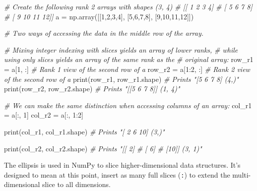 \documentclass[
]{article}
\newenvironment{Shaded}{}{}
\newcommand{\BuiltInTok}[1]{#1}
\newcommand{\CommentTok}[1]{\textcolor[rgb]{0.38,0.63,0.69}{\textit{#1}}}
\newcommand{\DecValTok}[1]{\textcolor[rgb]{0.25,0.63,0.44}{#1}}
\newcommand{\NormalTok}[1]{#1}
\newcommand{\OperatorTok}[1]{\textcolor[rgb]{0.40,0.40,0.40}{#1}}
\begin{document}
\begin{Shaded}
\begin{Highlighting}[]
\CommentTok{\# Create the following rank 2 arrays with shapes (3, 4)}
\CommentTok{\# [[ 1  2  3  4]}
\CommentTok{\#  [ 5  6  7  8]}
\CommentTok{\#  [ 9 10 11 12]]}
\NormalTok{a }\OperatorTok{=}\NormalTok{ np.array([[}\DecValTok{1}\NormalTok{,}\DecValTok{2}\NormalTok{,}\DecValTok{3}\NormalTok{,}\DecValTok{4}\NormalTok{], }
\NormalTok{              [}\DecValTok{5}\NormalTok{,}\DecValTok{6}\NormalTok{,}\DecValTok{7}\NormalTok{,}\DecValTok{8}\NormalTok{], }
\NormalTok{              [}\DecValTok{9}\NormalTok{,}\DecValTok{10}\NormalTok{,}\DecValTok{11}\NormalTok{,}\DecValTok{12}\NormalTok{]])}

\CommentTok{\# Two ways of accessing the data in the middle row of the array.}

\CommentTok{\# Mixing integer indexing with slices yields an array of lower ranks,}
\CommentTok{\# while using only slices yields an array of the same rank as the}
\CommentTok{\# original array:}
\NormalTok{row\_r1 }\OperatorTok{=}\NormalTok{ a[}\DecValTok{1}\NormalTok{, :]    }\CommentTok{\# Rank 1 view of the second row of a}
\NormalTok{row\_r2 }\OperatorTok{=}\NormalTok{ a[}\DecValTok{1}\NormalTok{:}\DecValTok{2}\NormalTok{, :]  }\CommentTok{\# Rank 2 view of the second row of a}
\BuiltInTok{print}\NormalTok{(row\_r1, row\_r1.shape)  }\CommentTok{\# Prints "[5 6 7 8] (4,)"}
\BuiltInTok{print}\NormalTok{(row\_r2, row\_r2.shape)  }\CommentTok{\# Prints "[[5 6 7 8]] (1, 4)"}

\CommentTok{\# We can make the same distinction when accessing columns of an array:}
\NormalTok{col\_r1 }\OperatorTok{=}\NormalTok{ a[:, }\DecValTok{1}\NormalTok{]}
\NormalTok{col\_r2 }\OperatorTok{=}\NormalTok{ a[:, }\DecValTok{1}\NormalTok{:}\DecValTok{2}\NormalTok{]}

\BuiltInTok{print}\NormalTok{(col\_r1, col\_r1.shape)  }\CommentTok{\# Prints "[ 2  6 10] (3,)"}

\BuiltInTok{print}\NormalTok{(col\_r2, col\_r2.shape)  }\CommentTok{\# Prints "[[ 2]}
                             \CommentTok{\#          [ 6]}
                             \CommentTok{\#          [10]] (3, 1)"}
\end{Highlighting}
\end{Shaded}

The ellipsis is used in NumPy to slice higher-dimensional data
structures. It's designed to mean at this point, insert as many full
slices (\texttt{:}) to extend the multi-dimensional slice to all
dimensions.
\end{document}
